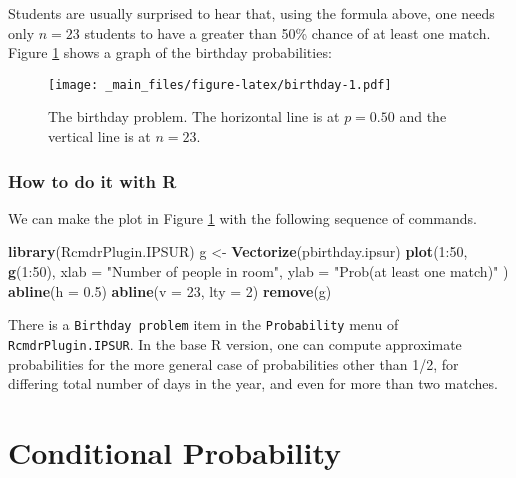 \documentclass[]{book}
\newenvironment{Shaded}{\begin{snugshade}}{\end{snugshade}}
\newcommand{\KeywordTok}[1]{\textcolor[rgb]{0.13,0.29,0.53}{\textbf{{#1}}}}
\newcommand{\DataTypeTok}[1]{\textcolor[rgb]{0.13,0.29,0.53}{{#1}}}
\newcommand{\DecValTok}[1]{\textcolor[rgb]{0.00,0.00,0.81}{{#1}}}
\newcommand{\FloatTok}[1]{\textcolor[rgb]{0.00,0.00,0.81}{{#1}}}
\newcommand{\StringTok}[1]{\textcolor[rgb]{0.31,0.60,0.02}{{#1}}}
\newcommand{\NormalTok}[1]{{#1}}
\numberwithin{equation}{chapter}
\numberwithin{figure}{chapter}
\theoremstyle{plain}
\theoremstyle{definition}
\theoremstyle{remark}
\theoremstyle{definition}
\theoremstyle{definition}
\theoremstyle{remark}
\begin{document}
Students are usually surprised to hear that, using the formula above,
one needs only \(n=23\) students to have a greater than 50\% chance of
at least one match. Figure \ref{fig:birthday} shows a graph of the
birthday probabilities:

\begin{figure}[htbp]
\centering
\texttt{[image: \_main\_files/figure-latex/birthday-1.pdf]}
\caption{\label{fig:birthday}\small The birthday problem. The horizontal line is
at \(p=0.50\) and the vertical line is at \(n=23\).}
\end{figure}




\subsubsection{How to do it with R}\label{how-to-do-it-with-r-14}

We can make the plot in Figure \ref{fig:birthday} with the following
sequence of commands.

\begin{Shaded}
\begin{Highlighting}[]
\KeywordTok{library}\NormalTok{(RcmdrPlugin.IPSUR)}
\NormalTok{g <-}\StringTok{ }\KeywordTok{Vectorize}\NormalTok{(pbirthday.ipsur)}
\KeywordTok{plot}\NormalTok{(}\DecValTok{1}\NormalTok{:}\DecValTok{50}\NormalTok{, }\KeywordTok{g}\NormalTok{(}\DecValTok{1}\NormalTok{:}\DecValTok{50}\NormalTok{), }\DataTypeTok{xlab =} \StringTok{"Number of people in room"}\NormalTok{, }
  \DataTypeTok{ylab =} \StringTok{"Prob(at least one match)"} \NormalTok{)}
\KeywordTok{abline}\NormalTok{(}\DataTypeTok{h =} \FloatTok{0.5}\NormalTok{)}
\KeywordTok{abline}\NormalTok{(}\DataTypeTok{v =} \DecValTok{23}\NormalTok{, }\DataTypeTok{lty =} \DecValTok{2}\NormalTok{)}
\KeywordTok{remove}\NormalTok{(g)}
\end{Highlighting}
\end{Shaded}

There is a \texttt{Birthday\ problem} item in the \texttt{Probability}
menu of \texttt{RcmdrPlugin.IPSUR}. In the base R version, one can
compute approximate probabilities for the more general case of
probabilities other than 1/2, for differing total number of days in the
year, and even for more than two matches.

\section{Conditional Probability}\label{sec-conditional-probability}
\end{document}
